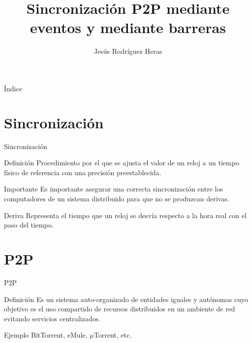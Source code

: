 \documentclass{beamer}
\title{Sincronización P2P mediante eventos y mediante barreras}
\author{Jesús Rodríguez Heras}
\begin{document}
\begin{frame}
  \titlepage
\end{frame}

\begin{frame}{Índice}
  \tableofcontents
\end{frame}


\section{Sincronización}
\begin{frame}{Sincronización}
	\begin{block}{Definición}
		Procedimiento por el que se ajusta el valor de un reloj a un tiempo físico de referencia con una precisión preestablecida.
	\end{block}
	\begin{alertblock}{Importante}
		Es importante asegurar una correcta sincronización entre los computadores de un sistema distribuido para que no se produzcan derivas.
	\end{alertblock}
	\begin{block}{Deriva}
		Representa el tiempo que un reloj se desvía respecto a la hora real con el paso del tiempo.
	\end{block}
\end{frame}

\section{P2P}
\begin{frame}{P2P}
	\begin{block}{Definición}
		Es un sistema auto-organizado de entidades iguales y autónomas cuyo objetivo es el uso compartido de recursos distribuidos en un ambiente de red evitando servicios centralizados.
	\end{block}
	\begin{exampleblock}{Ejemplo}
		BitTorrent, eMule, $\mu$Torrent, etc.
	\end{exampleblock}
\end{frame}
\end{document}
